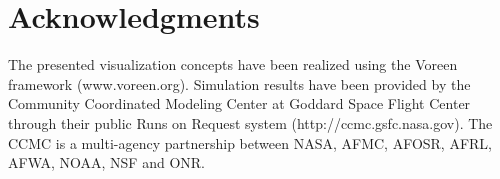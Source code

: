 \documentclass[journal]{vgtc}                %
\begin{document}
\section*{Acknowledgments}
The presented visualization concepts have been realized using the Voreen framework (www.voreen.org). Simulation results have been provided by the Community Coordinated Modeling Center at Goddard Space Flight Center through their public Runs on Request system (http://ccmc.gsfc.nasa.gov). The CCMC is a multi-agency partnership between NASA, AFMC, AFOSR, AFRL, AFWA, NOAA, NSF and ONR.



\end{document}
